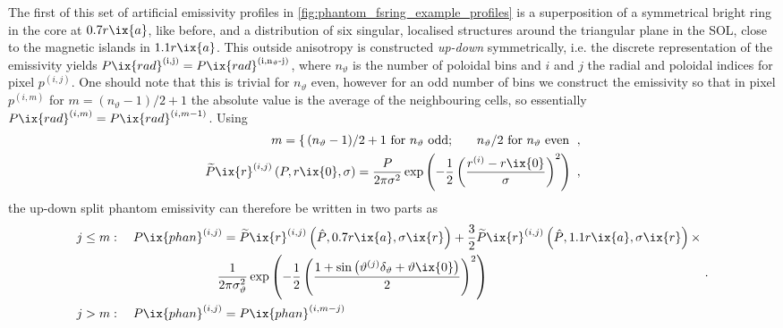 %
            The first of this set of artificial emissivity profiles in \cref{fig:phantom_fsring_example_profiles} is a superposition of a symmetrical bright ring in the core at $0.7r\ix{a}$, like before, and a distribution of six singular, localised structures around the triangular plane in the SOL, close to the magnetic islands in $1.1r\ix{a}$. This outside anisotropy is constructed \textit{up-down} symmetrically, i.e. the discrete representation of the emissivity yields $P\ix{rad}^{\left(\text{i,j}\right)}=P\ix{rad}^{\left(\text{i,n$_{\vartheta}$-j}\right)}$, where $n_{\vartheta}$ is the number of poloidal bins and $i$ and $j$ the radial and poloidal indices for pixel $p^{\left(i,j\right)}$. One should note that this is trivial for $n_{\vartheta}$ even, however for an odd number of bins we construct the emissivity so that in pixel $p^{\left(i,m\right)}$ for $m=(n_{\vartheta}-1)/2+1$ the absolute value is the average of the neighbouring cells, so essentially $P\ix{rad}^{\left(i,m\right)}=P\ix{rad}^{\left(i,m-1\right)}$. Using%
%
            \begin{align}%
                m=\left\{\,(n_{\vartheta}-1)/2+1\,\,\text{for }n_{\vartheta}\text{ odd;}\qquad n_{\vartheta}/2\,\,\text{for }n_{\vartheta}\text{ even}\right.\,\,,\nonumber\\%
                \widetilde{P}\ix{r}^{\left(i,j\right)}\left(P,r\ix{0},\sigma\right)=\frac{P}{2\pi\sigma^{2}}\exp\left(-\frac{1}{2}\left(\frac{r^{\left(i\right)}-r\ix{0}}{\sigma}\right)^{2}\right)\,\,,\nonumber%
            \end{align}%
%
            the up-down split phantom emissivity can therefore be written in two parts as%
%
            \begin{align}
                \begin{split}\label{eq:prad_anisym}%
                    j\leq m&:\quad P\ix{phan}^{\left(i,j\right)}=%
                        \widetilde{P}\ix{r}^{\left(i,j\right)}\left(\hat{P},0.7r\ix{a},\sigma\ix{r}\right)+\frac{3}{2}\widetilde{P}\ix{r}^{\left(i,j\right)}\left(\hat{P},1.1r\ix{a},\sigma\ix{r}\right)\times\\%
                        &\hspace*{3cm}\frac{1}{2\pi\sigma_{\vartheta}^{2}}\exp\left(-\frac{1}{2}\left(\frac{1+\sin\left(\vartheta^{\left(j\right)}\delta_{\vartheta}+\vartheta\ix{0}\right)}{2}\right)^{2}\right)\\%
                    j>m&:\quad P\ix{phan}^{\left(i,j\right)}=P\ix{phan}^{\left(i,m-j\right)}%
                \end{split}\,\,.%
            \end{align}%
